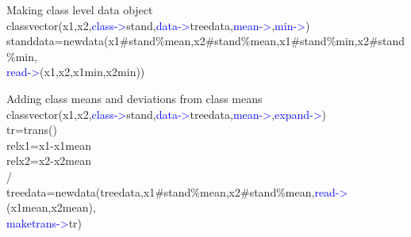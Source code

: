 \begin{example}[newclassdata]Making class level data object\\
\label{newclassdata}
\textcolor{VioletRed}{classvector}(x1,x2,\textcolor{blue}{class->}stand,\textcolor{blue}{data->}treedata,\textcolor{blue}{mean->},\textcolor{blue}{min->})\\
standdata=\textcolor{VioletRed}{newdata}(x1\#stand\%mean,x2\#stand\%mean,x1\#stand\%min,x2\#stand\%min,\\
\textcolor{blue}{read->}(x1,x2,x1min,x2min))
\end{example}
\begin{example}[addingclass]Adding class means and deviations from class means\\
\label{addingclass}
\textcolor{VioletRed}{classvector}(x1,x2,\textcolor{blue}{class->}stand,\textcolor{blue}{data->}treedata,\textcolor{blue}{mean->},\textcolor{blue}{expand->})\\
tr=\textcolor{VioletRed}{trans}()\\
relx1=x1-x1mean\\
relx2=x2-x2mean\\
/\\
treedata=\textcolor{VioletRed}{newdata}(treedata,x1\#stand\%mean,x2\#stand\%mean,\textcolor{blue}{read->}(x1mean,x2mean),\\
\textcolor{blue}{maketrans->}tr)
\end{example}
